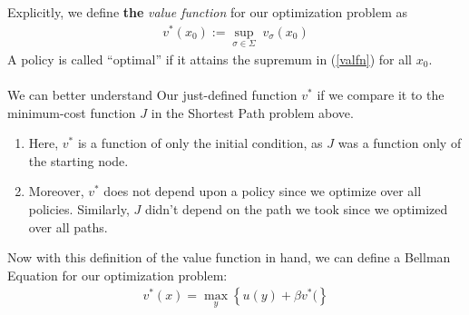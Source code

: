 \documentclass[a4paper,12pt]{scrartcl}
\begin{document}
Explicitly, we define \textbf{the} \emph{value function} for
our optimization problem as 
\begin{align}
  \label{valfn}
  v^*(x_0) := \sup_{\sigma\in\Sigma} \; v_\sigma(x_0)
\end{align}
A policy is called ``optimal'' if it attains the supremum in
(\ref{valfn}) for all $x_0$. 
\\
\\
We can better understand Our just-defined function $v^*$ if we
compare it to the minimum-cost function $J$ in the Shortest Path
problem above.
\begin{enumerate}
  \item Here, $v^*$ is a function of only the initial condition,
    as $J$ was a function only of the starting node.
  \item Moreover, $v^*$ does not depend upon a policy since we
    optimize over all policies. Similarly, $J$ didn't depend on
    the path we took since we optimized over all paths.
\end{enumerate}

Now with this definition of the value function in hand, we can
define a Bellman Equation for our optimization problem: 
\begin{align*}
  v^*(x) = \max_{y} \left\{ u(y) + \beta v^*( \right\}
\end{align*}










% 
\end{document}
